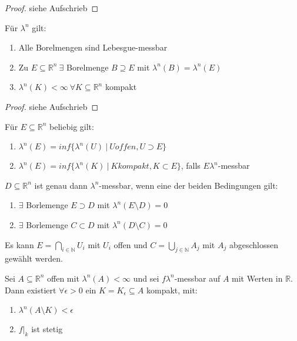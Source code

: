 \documentclass[11pt,a4paper,fleqn,openany]{report}
\begin{document}
    \begin{proof}
      siehe Aufschrieb
    \end{proof}

    \begin{theorem}
      Für $\lambda^n$ gilt:
      \begin{enumerate}
        \item Alle Borelmengen sind Lebesgue-messbar 
        \item Zu $E \subseteq \mathbb{R}^n \ \exists$ Borelmenge $B \supseteq E$ mit $\lambda^n(B) = \lambda^n(E)$
        \item $\lambda^n(K) < \infty \ \forall K \subseteq \mathbb{R}^n$ kompakt
      \end{enumerate}
    \end{theorem}

    \begin{proof}
      siehe Aufschrieb
    \end{proof}

    \begin{lemma}
      Für $E \subseteq \mathbb{R}^n$ beliebig gilt:
      \begin{enumerate}[label=\roman*)]
        \item $\lambda^n(E) = inf\{\lambda^n(U) \ | \ U offen, U \supset E\}$
        \item $\lambda^n(E) = inf\{\lambda^n(K) \ | \ K kompakt, K \subset E\}$, falls $E \lambda^n$-messbar
      \end{enumerate}
    \end{lemma}

    \begin{theorem}
      $D \subseteq \mathbb{R}^n$ ist genau dann $\lambda^n$-messbar, wenn eine der beiden Bedingungen gilt:
      \begin{enumerate}[label=\roman*)]
        \item $\exists$ Borlemenge $E \supset D$ mit $\lambda^n(E \setminus D) = 0$
        \item $\exists$ Borlemenge $C \subset D$ mit $\lambda^n(D \setminus C) = 0$
      \end{enumerate}
      Es kann $E = \bigcap\limits_{i \in \mathbb{N}} U_i$ mit $U_i$ offen und $C = \bigcup\limits_{j \in \mathbb{N}} A_j$ mit $A_j$ abgeschlossen gewählt werden.
    \end{theorem}

    \newpage

    \begin{theorem}
      Sei $A \subseteq \mathbb{R}^n$ offen mit $\lambda^n(A) < \infty$ und sei $f \lambda^n$-messbar auf $A$ mit Werten in $\mathbb{R}$. Dann existiert $\forall \epsilon > 0$ ein $K = K_{\epsilon} \subseteq A$ kompakt, mit:
      \begin{enumerate}[label=\roman*)]
        \item $\lambda^n(A \setminus K) < \epsilon$
        \item $f|_k$ ist stetig
      \end{enumerate}
    \end{theorem}
\end{document}
